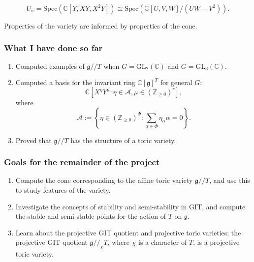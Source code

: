 \documentclass{beamer}
\theoremstyle{definition}
\begin{document}
\begin{frame}
\begin{figure}[H]
\end{figure}
\noindent
$$U_\sigma = \mathrm{Spec}(\mathbb{C}[Y, XY, X^2 Y]) \cong \mathrm{Spec}(\mathbb{C}[U, V, W]/(UW - V^2)).$$

\pause
Properties of the variety are informed by properties of the cone.
\end{frame}

\begin{frame}
\frametitle{What I have done so far}
\begin{enumerate}
\pause \item 
Computed examples of $\mathfrak{g} /\!\!/ T$ when $G = \mathrm{GL}_2(\mathbb{C})$ and $G = \mathrm{GL}_3(\mathbb{C})$.

\pause \item 
Computed a basis for the invariant ring $\mathbb{C}[\mathfrak{g}]^T$ for general $G$:
$$\mathbb{C}[X^\eta Y^\mu : \eta \in \mathcal{A}, \mu \in (\mathbb{Z}_{\ge 0})^r],$$
where
$$\mathcal{A} := \left\{\eta \in (\mathbb{Z}_{\ge 0})^\Phi : \sum_{\alpha \in \Phi} \eta_\alpha \alpha = 0\right\}.$$

\pause \item
Proved that $\mathfrak{g} /\!\!/ T$ has the structure of a toric variety.
\end{enumerate}
\end{frame}

\begin{frame}
\frametitle{Goals for the remainder of the project}
\begin{enumerate}
\pause \item
Compute the cone corresponding to the affine toric variety $\mathfrak{g} /\!\!/ T$, and use this to study features of the variety.

\pause \item
Investigate the concepts of stability and semi-stability in GIT, and compute the stable and semi-stable points for the action of $T$ on $\mathfrak{g}$.

\pause \item
Learn about the projective GIT quotient and projective toric varieties;
the projective GIT quotient $\mathfrak{g} /\!\!/_\chi T$, where $\chi$ is a character of $T$, is a projective toric variety.
\end{enumerate}
\end{frame}
\end{document}
